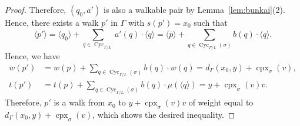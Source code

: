 \begin{proof}
Therefore, $(q_0, a')$ is also a walkable pair by Lemma~\ref{lem:bunkai}(2). 
Hence, there exists a walk $p'$ in $\Gamma$ with $s(p') = x_0$ such that 
\[
\langle \overline{p'} \rangle = \langle q_0 \rangle + \sum _{q \in \operatorname{Cyc}_{\Gamma /L}} a'(q) \cdot \langle q \rangle
= \langle \overline{p} \rangle + \sum _{q \in \operatorname{Cyc}_{\Gamma /L}(\sigma)} b(q) \cdot \langle q \rangle. 
\]
Hence, we have 
\begin{align*}
w(p') 
&= w(p) + \sum _{q \in \operatorname{Cyc}_{\Gamma /L}(\sigma)} b(q) \cdot w(q) 
= d_{\Gamma}( x_0, y) + \operatorname{cpx}_{\sigma}(v), \\
t(p') 
&= t(p) + \sum _{q \in \operatorname{Cyc}_{\Gamma /L}(\sigma)} b(q) \cdot \mu(\langle q \rangle) 
= y + \operatorname{cpx}_{\sigma}(v)v. 
\end{align*}
Therefore, $p'$ is a walk from $x_0$ to $y + \operatorname{cpx}_{\sigma}(v)v$ of weight 
equal to $d_{\Gamma}( x_0, y) + \operatorname{cpx}_{\sigma}(v)$, which shows the desired inequality. 
\end{proof}

